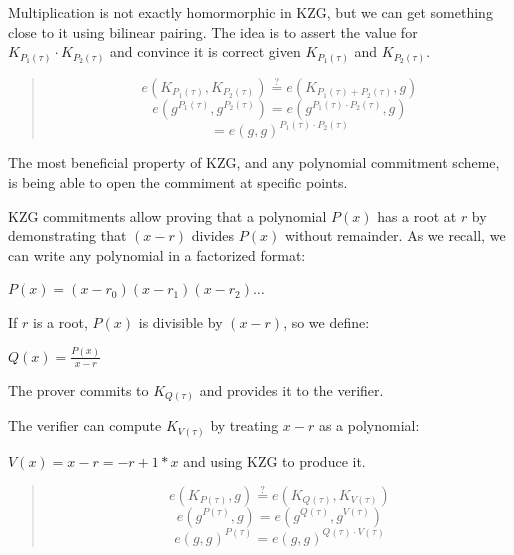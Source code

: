 Multiplication is not exactly homormorphic in KZG, but we can get something close to it using bilinear pairing.
The idea is to assert the value for $K_{P_1(\tau)} \cdot K_{P_2(\tau)}$ and convince it is correct given $K_{P_1(\tau)}$ and $K_{P_2(\tau)}$.

\begin{quote}
   \begin{equation*}
 e(K_{P_1(\tau)}, K_{P_2(\tau)}) \stackrel{?}{=} e(K_{P_1(\tau) + P_2(\tau)}, g)
   \end{equation*}
   \begin{equation*}
 e(g^{P_1(\tau)}, g^{P_2(\tau)}) = e(g^{P_1(\tau) \cdot P_2(\tau)}, g)
   \end{equation*}
   \begin{equation*}
 = e(g, g)^{P_1(\tau) \cdot P_2(\tau)}
   \end{equation*}
\end{quote}
   


The most beneficial property of KZG, and any polynomial commitment scheme, is being able to open the commiment at specific points.

KZG commitments allow proving that a polynomial \( P(x) \) has a root at \( r \) by demonstrating that \( (x - r) \) divides \( P(x) \) without remainder.
As we recall, we can write any polynomial in a factorized format:

$P(x) = (x - r_0)(x - r_1)(x - r_2) \dots$

If \( r \) is a root, \( P(x) \) is divisible by \( (x - r) \), so we define:

$Q(x) = \frac{P(x)}{x - r}$

The prover commits to \( K_{Q(\tau)} \) and provides it to the verifier.

The verifier can compute $K_{V(\tau)}$ by treating $x-r$ as a polynomial:

$V(x) = x - r = -r + 1 * x$
and using KZG to produce it.
\begin{quote}
   \begin{equation*}
 e(K_{P(\tau)}, g) \stackrel{?}{=} e(K_{Q(\tau)}, K_{V(\tau)})
   \end{equation*}
   \begin{equation*}
 e(g^{P(\tau)}, g) = e(g^{Q(\tau)}, g^{V(\tau)})
   \end{equation*}
   \begin{equation*}
 e(g, g)^{P(\tau)} = e(g, g)^{Q(\tau) \cdot V(\tau)}
   \end{equation*}
\end{quote}


